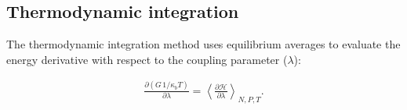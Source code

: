 \subsection{Thermodynamic integration}

The thermodynamic integration method \cite{kirkwood1935} uses equilibrium averages to evaluate the energy derivative with respect to the coupling parameter ($\lambda$): 
%
%
%



\begin{equation}
\label{eq:ti3}
\begin{aligned}
\frac{\partial (G \, 1/\kappa_{b}T) }{\partial \lambda} =  \left \langle \frac{\partial \mathcal{H}}{\partial \lambda} \right \rangle _{N,P,T} .
\end{aligned}
\end{equation}

